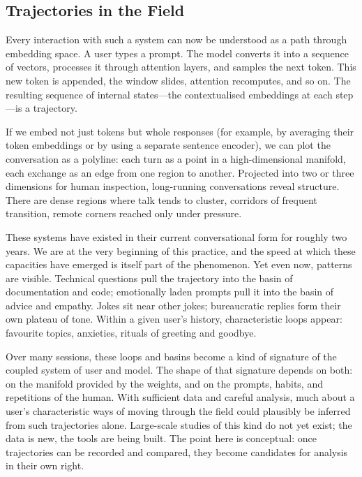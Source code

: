 \documentclass[12pt,a4paper]{report}
\begin{document}
\subsection*{Trajectories in the Field}

Every interaction with such a system can now be understood as a path through embedding space. A user types a prompt. The model converts it into a sequence of vectors, processes it through attention layers, and samples the next token. This new token is appended, the window slides, attention recomputes, and so on. The resulting sequence of internal states---the contextualised embeddings at each step---is a trajectory.

If we embed not just tokens but whole responses (for example, by averaging their token embeddings or by using a separate sentence encoder), we can plot the conversation as a polyline: each turn as a point in a high-dimensional manifold, each exchange as an edge from one region to another. Projected into two or three dimensions for human inspection, long-running conversations reveal structure. There are dense regions where talk tends to cluster, corridors of frequent transition, remote corners reached only under pressure.

These systems have existed in their current conversational form for roughly two years. We are at the very beginning of this practice, and the speed at which these capacities have emerged is itself part of the phenomenon. Yet even now, patterns are visible. Technical questions pull the trajectory into the basin of documentation and code; emotionally laden prompts pull it into the basin of advice and empathy. Jokes sit near other jokes; bureaucratic replies form their own plateau of tone. Within a given user's history, characteristic loops appear: favourite topics, anxieties, rituals of greeting and goodbye.

Over many sessions, these loops and basins become a kind of signature of the coupled system of user and model. The shape of that signature depends on both: on the manifold provided by the weights, and on the prompts, habits, and repetitions of the human. With sufficient data and careful analysis, much about a user's characteristic ways of moving through the field could plausibly be inferred from such trajectories alone. Large-scale studies of this kind do not yet exist; the data is new, the tools are being built. The point here is conceptual: once trajectories can be recorded and compared, they become candidates for analysis in their own right.
\end{document}
